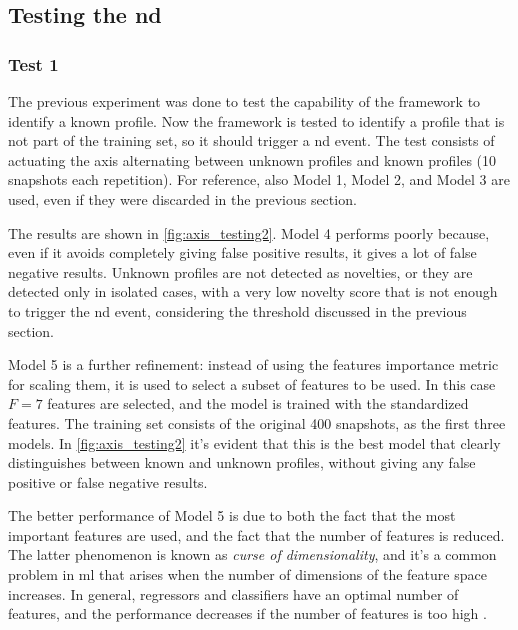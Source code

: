 \subsection{Testing the \gls{nd}}
\subsubsection{Test 1}
The previous experiment was done to test the capability of the framework to identify a known profile. Now the framework is tested to identify a profile that is not part of the training set, so it should trigger a \gls{nd} event. The test consists of actuating the axis alternating between unknown profiles and known profiles (10 snapshots each repetition). For reference, also Model 1, Model 2, and Model 3 are used, even if they were discarded in the previous section. 

The results are shown in \autoref{fig:axis_testing2}. Model 4 performs poorly because, even if it avoids completely giving false positive results, it gives a lot of false negative results. Unknown profiles are not detected as novelties, or they are detected only in isolated cases, with a very low novelty score that is not enough to trigger the \gls{nd} event, considering the threshold discussed in the previous section.

Model 5 is a further refinement: instead of using the features importance metric for scaling them, it is used to select a subset of features to be used. In this case $F=7$ features are selected, and the model is trained with the standardized features. The training set consists of the original 400 snapshots, as the first three models. In \autoref{fig:axis_testing2} it's evident that this is the best model that clearly distinguishes between known and unknown profiles, without giving any false positive or false negative results.

The better performance of Model 5 is due to both the fact that the most important features are used, and the fact that the number of features is reduced. The latter phenomenon is known as \emph{curse of dimensionality}, and it's a common problem in \gls{ml} that arises when the number of dimensions of the feature space increases. In general, regressors and classifiers have an optimal number of features, and the performance decreases if the number of features is too high \cite{curse_dim}. 

